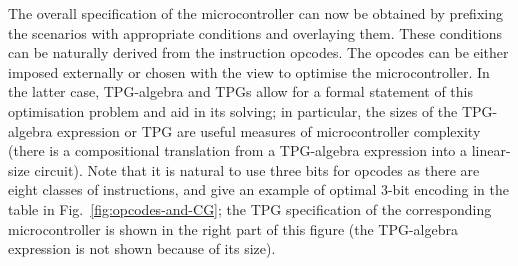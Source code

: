 The overall specification of the microcontroller can now be obtained
by prefixing the scenarios with appropriate conditions and overlaying
them. These conditions can be naturally derived from the instruction
opcodes. The opcodes can be either imposed externally or chosen with
the view to optimise the microcontroller. In the latter case, TPG-algebra
and TPGs allow for a formal statement of this optimisation problem
and aid in its solving; in particular, the sizes of the TPG-algebra
expression or TPG are useful measures of microcontroller complexity
(there is a compositional translation from a TPG-algebra expression
into a linear-size circuit). Note that it is natural to use three bits for opcodes as there
are eight classes of instructions, and give an example of optimal
3-bit encoding in the table in Fig.~\ref{fig:opcodes-and-CG}; the
TPG specification of the corresponding microcontroller is shown in
the right part of this figure (the TPG-algebra expression is not shown
because of its size).

